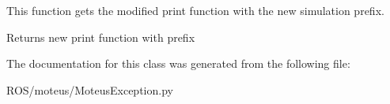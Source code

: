 This function gets the modified print function with the new simulation prefix. 

\begin{DoxyReturn}{Returns}
new print function with prefix 
\end{DoxyReturn}


The documentation for this class was generated from the following file\+:\begin{DoxyCompactItemize}
\item 
R\+O\+S/moteus/Moteus\+Exception.\+py\end{DoxyCompactItemize}
